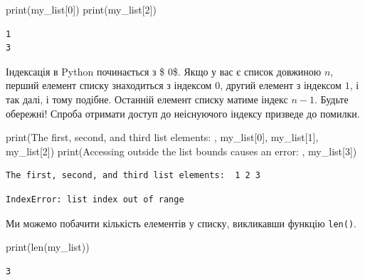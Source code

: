 \documentclass[
  letterpaper,
]{report}
\newenvironment{Shaded}{\begin{snugshade}}{\end{snugshade}}
\newcommand{\BuiltInTok}[1]{\textcolor[rgb]{0.00,0.23,0.31}{#1}}
\newcommand{\DecValTok}[1]{\textcolor[rgb]{0.68,0.00,0.00}{#1}}
\newcommand{\NormalTok}[1]{\textcolor[rgb]{0.00,0.23,0.31}{#1}}
\newcommand{\StringTok}[1]{\textcolor[rgb]{0.13,0.47,0.30}{#1}}
\begin{document}
\begin{Shaded}
\begin{Highlighting}[]
\BuiltInTok{print}\NormalTok{(my\_list[}\DecValTok{0}\NormalTok{])}
\BuiltInTok{print}\NormalTok{(my\_list[}\DecValTok{2}\NormalTok{])}
\end{Highlighting}
\end{Shaded}

\begin{verbatim}
1
3
\end{verbatim}

Індексація в Python починається з \$ 0\$. Якщо у вас є список довжиною
\(n\), перший елемент списку знаходиться з індексом \(0\), другий
елемент з індексом \(1\), і так далі, і тому подібне. Останній елемент
списку матиме індекс \(n-1\). Будьте обережні! Спроба отримати доступ до
неіснуючого індексу призведе до помилки.

\begin{Shaded}
\begin{Highlighting}[]
\BuiltInTok{print}\NormalTok{(}\StringTok{\textquotesingle{}The first, second, and third list elements: \textquotesingle{}}\NormalTok{, my\_list[}\DecValTok{0}\NormalTok{], my\_list[}\DecValTok{1}\NormalTok{], my\_list[}\DecValTok{2}\NormalTok{])}
\BuiltInTok{print}\NormalTok{(}\StringTok{\textquotesingle{}Accessing outside the list bounds causes an error: \textquotesingle{}}\NormalTok{, my\_list[}\DecValTok{3}\NormalTok{])}
\end{Highlighting}
\end{Shaded}

\begin{verbatim}
The first, second, and third list elements:  1 2 3
\end{verbatim}

\begin{verbatim}
IndexError: list index out of range
\end{verbatim}

Ми можемо побачити кількість елементів у списку, викликавши функцію
\texttt{len()}.

\begin{Shaded}
\begin{Highlighting}[]
\BuiltInTok{print}\NormalTok{(}\BuiltInTok{len}\NormalTok{(my\_list))}
\end{Highlighting}
\end{Shaded}

\begin{verbatim}
3
\end{verbatim}
\end{document}
